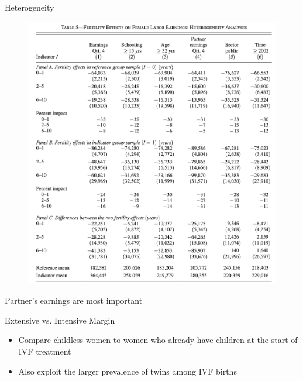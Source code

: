 \documentclass[11pt,notes=hide,aspectratio=169,mathserif]{beamer}
\begin{document}
\begin{frame}{Heterogeneity}
  \begin{figure}
    \centering
    \includegraphics[width=0.9\linewidth]{inputs/ivf11.png}
    \end{figure}
    Partner's earnings are most important
\end{frame}



\begin{frame}{Extensive vs. Intensive Margin}
\small
\begin{itemize}
  \item Compare childless women to women who already have children at the start of IVF treatment
  \item Also exploit the larger prevalence of twins among IVF births
\end{itemize}
\end{frame}
\end{document}
